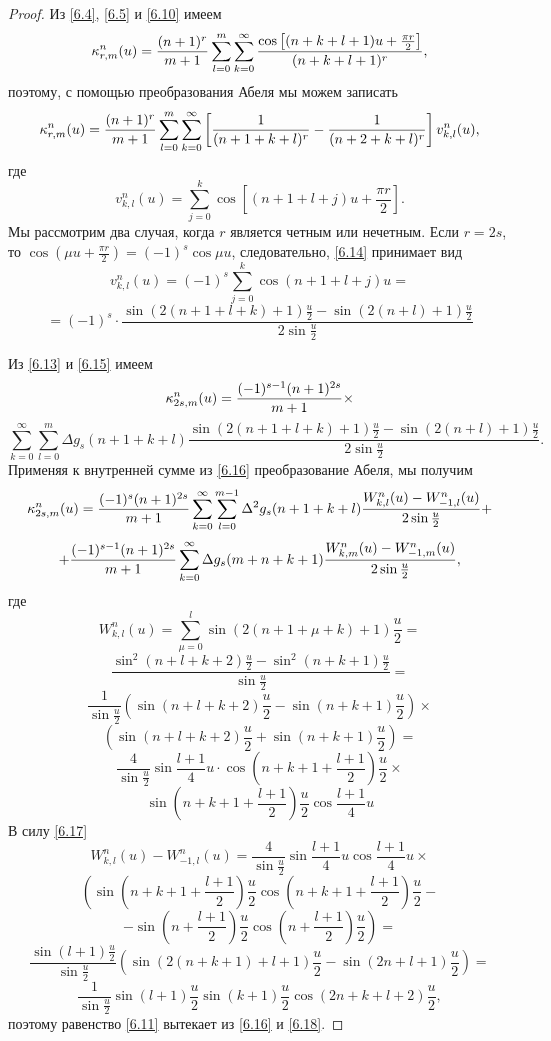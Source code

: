  \begin{proof}
Из \eqref{6.4}, \eqref{6.5} и \eqref{6.10} имеем
$$
\kappa_{r,m}^{n}(u)={(n+1)^r\over m+1}\sum\limits_{l=0}^m\sum\limits_{k=0}^\infty
\frac{\cos\left[(n+k+l+1)u+\frac{\pi r}{2}\right]}{(n+k+l+1)^r},
$$
поэтому, с помощью преобразования Абеля мы можем записать
\begin{equation}\label{6.13}
    \kappa_{r,m}^{n}(u)={(n+1)^r\over m+1}\sum\limits_{l=0}^m
\sum\limits_{k=0}^\infty\left[\frac{1}{(n+1+k+l)^r}-\frac{1}{(n+2+k+l)^r}
\right]v^n_{k,l}(u),
\end{equation}
где
\begin{equation}\label{6.14}
    v^n_{k,l}(u)=\sum\limits_{j=0}^{k}\cos[(n+1+l+j)u+\frac{\pi r}{2}].
\end{equation}
Мы рассмотрим два случая, когда $r$ является четным или нечетным. Если
$r=2s$, то $\cos(\mu u+\frac{\pi r}{2})=(-1)^s\cos\mu u$, следовательно, \eqref{6.14} принимает вид
$$
v^n_{k,l}(u)=(-1)^s\sum\limits_{j=0}^k\cos(n+1+l+j)u=
$$
\begin{equation}\label{6.15}
    =(-1)^s\cdot\frac{\sin(2(n+1+l+k)+1)\frac u2-\sin(2(n+l)+1)\frac u2}{2\sin\frac u2}
\end{equation}


Из \eqref{6.13} и \eqref{6.15} имеем
$$
\kappa_{2s,m}^n(u)={(-1)^{s-1}(n+1)^{2s}\over m+1}\times
$$
\begin{equation}\label{6.16}
    \sum\limits_{k=0}^\infty\sum\limits_{l=0}^m \Delta
g_s(n+1+k+l)\frac{\sin(2(n+1+l+k)+1)\frac u2- \sin(2(n+l)+1)\frac u2}{2\sin\frac u2}.
\end{equation}
Применяя к внутренней сумме из \eqref{6.16} преобразование Абеля, мы получим
$$
\kappa_{2s,m}^n(u)={(-1)^{s}(n+1)^{2s}\over m+1}\sum\limits_{k=0}^\infty
\sum\limits_{l=0}^{m-1}\Delta^2 g_s(n+1+k+l)\frac{W^n_{k,l}(u)-W^n_{-1,l}(u)}{2\sin\frac u2}+
$$
$$+{(-1)^{s-1}(n+1)^{2s}\over m+1}\sum\limits_{k=0}^\infty\Delta g_s(m+n+k+1)
\frac{W^n_{k,m}(u)-W^n_{-1,m}(u)}{2\sin\frac u2},
$$
где
$$W^n_{k,l}(u)=\sum\limits_{\mu=0}^l\sin(2(n+1+\mu+k)+1)\frac u2=
$$
$$
\frac{\sin^2(n+l+k+2)\frac u2-\sin^2(n+k+1)\frac u2}{\sin\frac u2}=
$$
$$
\frac{1}{\sin\frac u2}(\sin(n+l+k+2)\frac u2-\sin(n+k+1)\frac u2)\times
$$
$$
(\sin(n+l+k+2)\frac u2+\sin(n+k+1)\frac u2)=
$$
$$\frac{4}{\sin\frac u2}\sin\frac{l+1}{4}u\cdot\cos(n+k+1+\frac{l+1}{2})\frac u2\times
$$
\begin{equation}\label{6.17}
    \sin(n+k+1+\frac{l+1}{2})\frac u2\cos\frac{l+1}{4}u
\end{equation}
В силу  \eqref{6.17}
$$
W_{k,l}^n(u)-W_{-1,l}^n(u)=\frac{4}{\sin\frac u2}\sin\frac{l+1}{4}u\cos\frac{l+1}{4}u\times
$$
$$
\left(\sin(n+k+1+\frac{l+1}{2})\frac u2\cos(n+k+1+\frac{l+1}{2})\frac u2-\right.
$$
$$
\left.-\sin(n+\frac{l+1}{2})\frac u2\cos(n+\frac{l+1}{2})\frac u2\right)=
$$
$$
\frac{\sin(l+1)\frac{u}{2}}{\sin\frac u2}
\left(\sin(2(n+k+1)+l+1)\frac u2-\sin(2n+l+1)\frac u2\right)=
$$
\begin{equation}\label{6.18}
    \frac{1}{\sin\frac u2}\sin(l+1)\frac{u}{2}\sin(k+1)\frac{u}{2}
\cos(2n+k+l+2)\frac u2,
\end{equation}
поэтому равенство \eqref{6.11}  вытекает из \eqref{6.16} и \eqref{6.18}.


\end{proof}
